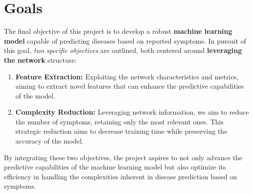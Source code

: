 

\section{Goals}

The final objective of this project is to develop a robust \textbf{machine learning model} capable of predicting 
diseases based on reported symptoms. In pursuit of this goal, \textit{two specific objectives} are outlined, 
both centered around \textbf{leveraging the network} structure:\\

\begin{enumerate}
	\setlength\itemsep{1em}
    \item \textbf{Feature Extraction:} Exploiting the network characteristics and metrics, aiming to 
    extract novel features that can enhance the predictive capabilities of the model. 
    
    \item \textbf{Complexity Reduction:} Leveraging network information, we aim to reduce 
    the number of symptoms, retaining only the most relevant ones. This strategic reduction aims to decrease 
    training time while preserving the accuracy of the model.
\end{enumerate}

\vspace{0.4cm}
By integrating these two objectives, the project aspires to not only advance the predictive capabilities of the machine 
learning model but also optimize its efficiency in handling the complexities inherent in disease prediction based on symptoms.

